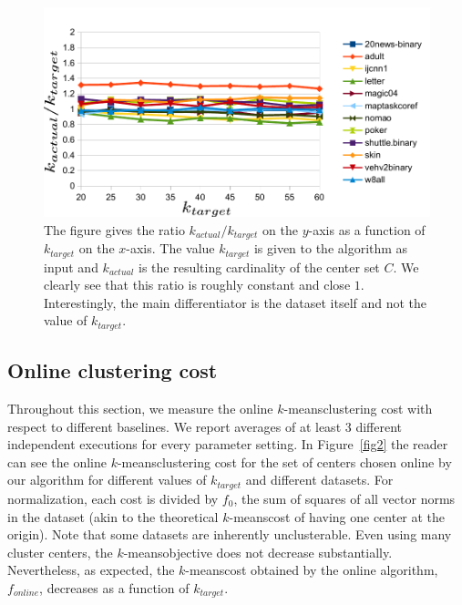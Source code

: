 \documentclass[11pt,twoside]{article}
\newcommand{\kmeans}{$k$-means}
\begin{document}
\begin{figure}[htbp]
\begin{center}
\includegraphics{figures/plot1.pdf}
\caption{The figure gives the ratio $k_{actual}/k_{target}$ on the $y$-axis as a function of $k_{target}$ on the $x$-axis.
The value $k_{target}$ is given to the algorithm as input and $k_{actual}$ is the resulting cardinality of the center set $C$.
We clearly see that this ratio is roughly constant and close $1$. Interestingly, the main differentiator is the dataset itself and not the value of $k_{target}$.
}
\label{fig1}
\end{center}
\end{figure}

\subsection{Online clustering cost}
Throughout this section, we measure the online \kmeans clustering cost with respect to different baselines. We report averages of at least 3 different independent executions for every parameter setting.
In Figure~\ref{fig2} the reader can see the online \kmeans clustering cost for the set of centers chosen online by our algorithm for different values of $k_{target}$ and different datasets.
For normalization, each cost is divided by $f_0$, the sum of squares of all vector norms in the dataset (akin to the theoretical \kmeans cost of having one center at the origin).
Note that some datasets are inherently unclusterable. Even using many cluster centers, the \kmeans objective does not decrease substantially.
Nevertheless, as expected, the \kmeans cost obtained by the online algorithm, $f_{online}$, decreases as a function of $k_{target}$. 
\end{document}
